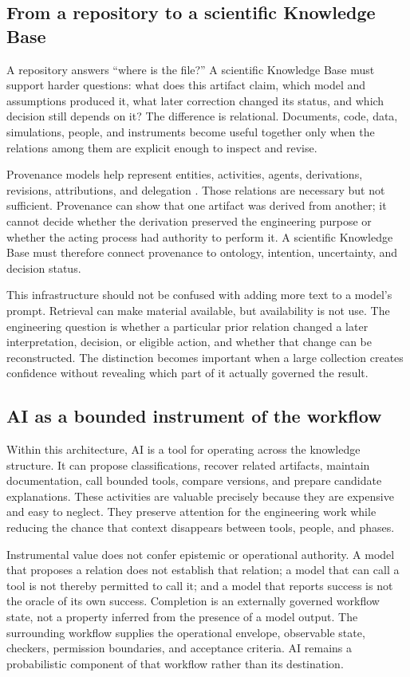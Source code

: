 \documentclass[10pt,a4paper]{article}
\begin{document}
\subsection{From a repository to a scientific Knowledge Base}

A repository answers ``where is the file?'' A scientific Knowledge Base must support harder questions: what does this artifact claim, which model and assumptions produced it, what later correction changed its status, and which decision still depends on it? The difference is relational. Documents, code, data, simulations, people, and instruments become useful together only when the relations among them are explicit enough to inspect and revise.

Provenance models help represent entities, activities, agents, derivations, revisions, attributions, and delegation \cite{provdm2013,provo2013}. Those relations are necessary but not sufficient. Provenance can show that one artifact was derived from another; it cannot decide whether the derivation preserved the engineering purpose or whether the acting process had authority to perform it. A scientific Knowledge Base must therefore connect provenance to ontology, intention, uncertainty, and decision status.

This infrastructure should not be confused with adding more text to a model's prompt. Retrieval can make material available, but availability is not use. The engineering question is whether a particular prior relation changed a later interpretation, decision, or eligible action, and whether that change can be reconstructed. The distinction becomes important when a large collection creates confidence without revealing which part of it actually governed the result.

\subsection{AI as a bounded instrument of the workflow}

Within this architecture, AI is a tool for operating across the knowledge structure. It can propose classifications, recover related artifacts, maintain documentation, call bounded tools, compare versions, and prepare candidate explanations. These activities are valuable precisely because they are expensive and easy to neglect. They preserve attention for the engineering work while reducing the chance that context disappears between tools, people, and phases.

Instrumental value does not confer epistemic or operational authority. A model that proposes a relation does not establish that relation; a model that can call a tool is not thereby permitted to call it; and a model that reports success is not the oracle of its own success. Completion is an externally governed workflow state, not a property inferred from the presence of a model output. The surrounding workflow supplies the operational envelope, observable state, checkers, permission boundaries, and acceptance criteria. AI remains a probabilistic component of that workflow rather than its destination.
\end{document}
